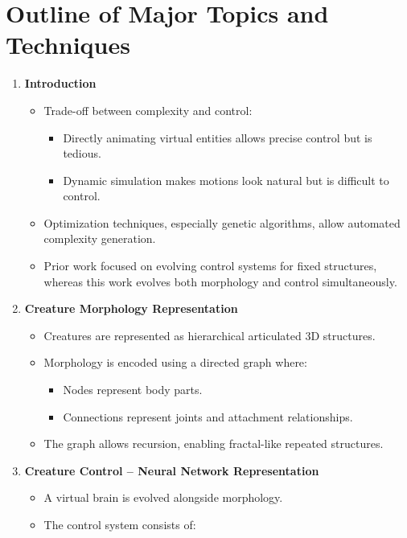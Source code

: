 \documentclass[12pt]{article}
\begin{document}
\section{Outline of Major Topics and Techniques}
\begin{enumerate}[noitemsep]
    \item \textbf{Introduction}
    \begin{itemize}[noitemsep]
        \item Trade-off between complexity and control:
        \begin{itemize}[noitemsep]
            \item Directly animating virtual entities allows precise control but is tedious.
            \item Dynamic simulation makes motions look natural but is difficult to control.
        \end{itemize}
        \item Optimization techniques, especially genetic algorithms, allow automated complexity generation.
        \item Prior work focused on evolving control systems for fixed structures, whereas this work evolves both morphology and control simultaneously.
    \end{itemize}
    \item \textbf{Creature Morphology Representation}
    \begin{itemize}[noitemsep]
        \item Creatures are represented as hierarchical articulated 3D structures.
        \item Morphology is encoded using a directed graph where:
        \begin{itemize}[noitemsep]
            \item Nodes represent body parts.
            \item Connections represent joints and attachment relationships.
        \end{itemize}
        \item The graph allows recursion, enabling fractal-like repeated structures.
    \end{itemize}
    \item \textbf{Creature Control – Neural Network Representation}
    \begin{itemize}[noitemsep]
        \item A virtual brain is evolved alongside morphology.
        \item The control system consists of:

\end{itemize}
\end{enumerate}
\end{document}
